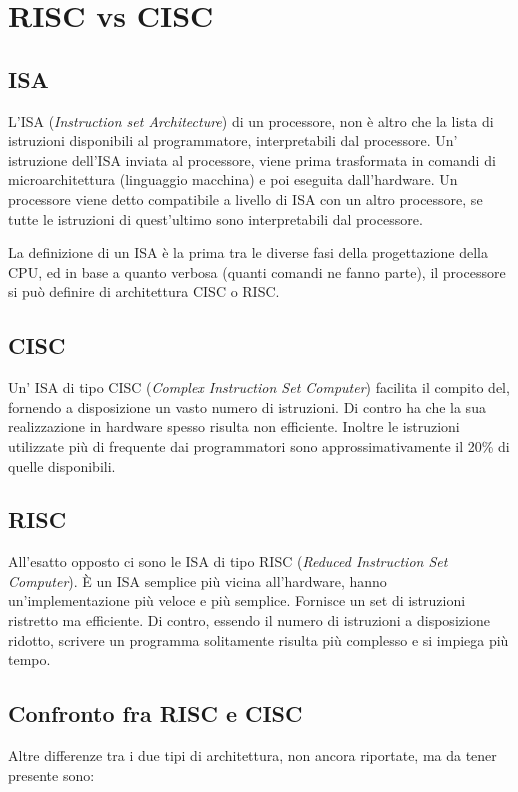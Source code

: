 \documentclass[../ace.tex]{subfiles}
\begin{document}
\section{RISC vs CISC}
\subsection{ISA}
L'ISA (\textit{Instruction set Architecture}) di un processore, non è altro che la lista di istruzioni disponibili
al programmatore, interpretabili dal processore.
Un' istruzione dell'ISA inviata al processore, viene prima trasformata in comandi di microarchitettura
(linguaggio macchina) e poi eseguita dall'hardware.
Un processore viene detto compatibile a livello di ISA con un altro processore, se tutte le istruzioni di
quest'ultimo sono interpretabili dal processore.

La definizione di un ISA è la prima tra le diverse fasi della progettazione della CPU, ed in base
a quanto verbosa (quanti comandi ne fanno parte), il processore si può definire di architettura CISC o RISC.

\subsection{CISC}
Un' ISA di tipo CISC (\textit{Complex Instruction Set Computer}) facilita il compito del, fornendo a disposizione
un vasto numero di istruzioni. Di contro ha che la sua realizzazione in hardware spesso risulta non
efficiente.
Inoltre le istruzioni utilizzate più di frequente dai programmatori sono approssimativamente il 20\% di quelle
disponibili.

\subsection{RISC}
All'esatto opposto ci sono le ISA di tipo RISC (\textit{Reduced Instruction Set Computer}).
È un ISA semplice più vicina all'hardware, hanno un'implementazione più veloce e più semplice.
Fornisce un set di istruzioni ristretto ma efficiente.
Di contro, essendo il numero di istruzioni a disposizione ridotto, scrivere un programma solitamente risulta
più complesso e si impiega più tempo.
\subsection{Confronto fra RISC e CISC}
Altre differenze tra i due tipi di architettura, non ancora riportate, ma da tener presente sono:
\end{document}
